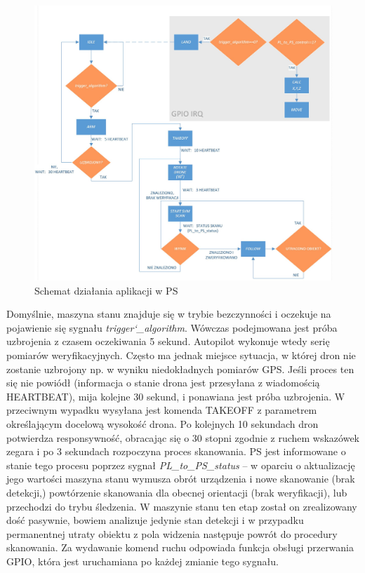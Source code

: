 \begin{figure}[ht]
	\centering
	\includegraphics[width=16cm]{5_PS_FSM.jpg}
	\caption{Schemat działania aplikacji w PS}
	\label{fig:PL_FSM_sch}
\end{figure}
Domyślnie, maszyna stanu znajduje się w trybie bezczynności i oczekuje na pojawienie się sygnału \textit{trigger\char`_algorithm}. Wówczas podejmowana jest próba uzbrojenia z czasem oczekiwania 5 sekund. Autopilot wykonuje wtedy serię pomiarów weryfikacyjnych. Często ma jednak miejsce sytuacja, w której dron nie zostanie uzbrojony np. w wyniku niedokładnych pomiarów GPS. Jeśli proces ten się nie powiódł (informacja o stanie drona jest przesyłana z wiadomością HEARTBEAT), mija kolejne 30 sekund, i ponawiana jest próba uzbrojenia. W przeciwnym wypadku wysyłana jest komenda TAKEOFF z parametrem określającym docelową wysokość drona. Po kolejnych 10 sekundach dron potwierdza responsywność, obracając się o 30 stopni zgodnie z ruchem wskazówek zegara i po 3 sekundach rozpoczyna proces skanowania. PS jest informowane o stanie tego procesu poprzez sygnał \textit{PL\_to\_PS\_status} -- w oparciu o aktualizację jego wartości maszyna stanu wymusza obrót urządzenia i nowe skanowanie (brak detekcji,) powtórzenie skanowania dla obecnej orientacji (brak weryfikacji), lub przechodzi do trybu śledzenia. W maszynie stanu ten etap został on zrealizowany dość pasywnie, bowiem analizuje jedynie stan detekcji i w przypadku permanentnej utraty obiektu z pola widzenia następuje powrót do procedury skanowania. Za wydawanie komend ruchu odpowiada funkcja obsługi przerwania GPIO, która jest uruchamiana po każdej zmianie tego sygnału.

